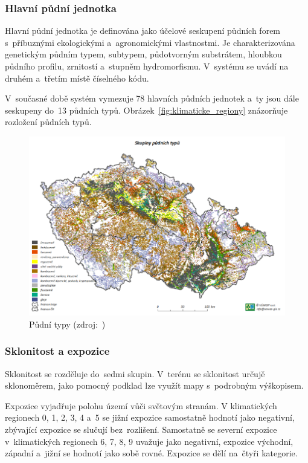 \subsubsection{Hlavní půdní jednotka}
\label{hpj}

Hlavní půdní jednotka je definována jako účelové seskupení půdních forem s~příbuznými ekologickými a~agronomickými vlastnostmi. Je charakterizována genetickým půdním typem, subtypem, půdotvorným substrátem, hloubkou půdního profilu, zrnitostí a~stupněm hydromorfismu. V~systému  se uvádí na druhém a~třetím místě číselného kódu.

V~současné době systém  vymezuje 78 hlavních půdních jednotek a~ty jsou dále seskupeny do~13 půdních typů. Obrázek~\ref{fig:klimaticke_regiony} znázorňuje rozložení půdních typů.

	\begin{figure}[H]
		\centering
		\includegraphics[width=.9\textwidth]{./pictures/pudni_typy.png}
		\caption[Půdní typy]{Půdní typy (zdroj:~\citep{vumop_bpej})}
		\label{fig:pudni_typy}
 	\end{figure}

\subsubsection{Sklonitost a expozice}
\label{sklonitost_expozice}

Sklonitost se rozděluje do~sedmi skupin. V~terénu se sklonitost určujě sklonoměrem, jako pomocný podklad lze využít mapy s~podrobným výškopisem.

Expozice vyjadřuje polohu území  vůči světovým stranám. V klimatických regionech 0, 1, 2, 3, 4 a~5 se jižní expozice samostatně hodnotí jako negativní, zbývající expozice se slučují bez~rozlišení. Samostatně se severní expozice v~klimatických regionech 6, 7, 8, 9 uvažuje jako negativní, expozice východní, západní a~jižní se hodnotí jako sobě rovné. Expozice se dělí na~čtyři kategorie.

